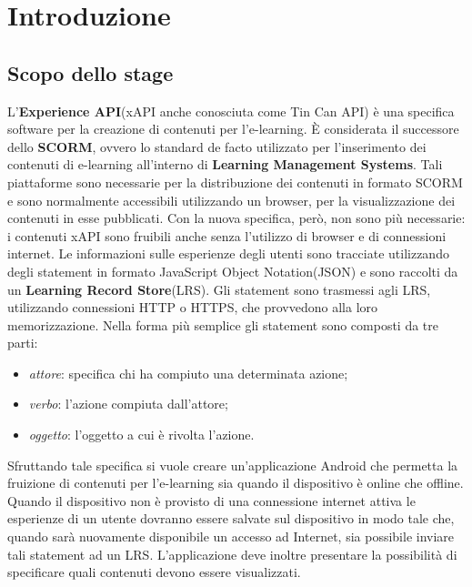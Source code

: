 \documentclass[../Tesi.tex]{subfiles}
\begin{document}
\section{Introduzione}
	
	\subsection{Scopo dello stage}
		L'\textbf{Experience API}(xAPI anche conosciuta come Tin Can API) è una specifica software per la creazione di contenuti per l'e-learning. È considerata il successore dello \textbf{SCORM}, ovvero lo standard de facto utilizzato per l'inserimento dei contenuti di e-learning all'interno di \textbf{Learning Management Systems}. Tali piattaforme sono necessarie per la distribuzione dei contenuti in formato SCORM e sono normalmente accessibili utilizzando un browser, per la visualizzazione dei contenuti in esse pubblicati. Con la nuova specifica, però, non sono più necessarie: i contenuti xAPI sono fruibili anche senza l'utilizzo di browser e di connessioni internet. Le informazioni sulle esperienze degli utenti sono tracciate utilizzando degli statement in formato JavaScript Object Notation(JSON) e sono raccolti da un \textbf{Learning Record Store}(LRS). Gli statement sono trasmessi agli LRS, utilizzando connessioni HTTP o HTTPS, che provvedono alla loro memorizzazione. Nella forma più semplice gli statement sono composti da tre parti: 
		\begin{itemize}
			\item \textit{attore}: specifica chi ha compiuto una determinata azione;
			\item \textit{verbo}: l'azione compiuta dall'attore;
			\item \textit{oggetto}: l'oggetto a cui è rivolta l'azione.
		\end{itemize}
		Sfruttando tale specifica si vuole creare un'applicazione Android che permetta la fruizione di contenuti per l'e-learning sia quando il dispositivo è online che offline. Quando il dispositivo non è provisto di una connessione internet attiva le esperienze di un utente dovranno essere salvate sul dispositivo in modo tale che, quando sarà nuovamente disponibile un accesso ad Internet, sia possibile inviare tali statement ad un LRS. L'applicazione deve inoltre presentare la possibilità di specificare quali contenuti devono essere visualizzati.
\end{document}
